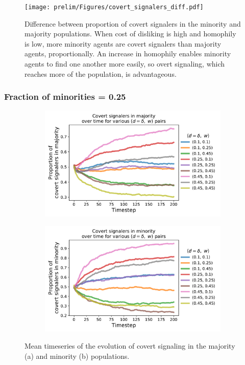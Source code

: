 \documentclass[11pt,letterpaper]{article}
\begin{document}
\begin{figure}[H]
  \centering
    \texttt{[image: prelim/Figures/covert\_signalers\_diff.pdf]}
  \caption{Difference between proportion of covert signalers in the minority 
    and majority populations. When cost of disliking is high and homophily is 
    low, more minority agents are covert signalers than majority agents,
    proportionally. An increase in homophily enables minority agents to 
    find one another more easily, so overt signaling, which reaches more of
    the population, is advantageous.
  }
  \label{fig:}
\end{figure}

\subsubsection{Fraction of minorities = 0.25}

\begin{figure}[H]
  \centering
  \begin{subfigure}{0.49\textwidth}
    \centering
    \includegraphics[width=\textwidth]{prelim/Figures/covert_series_majority_025.pdf}
    \caption{}
    \label{fig:}
  \end{subfigure}
  \begin{subfigure}{0.49\textwidth}
    \centering
    \includegraphics[width=\textwidth]{prelim/Figures/covert_series_minority_025.pdf}
    \caption{}
    \label{fig:}
  \end{subfigure}
  \caption{Mean timeseries of the evolution of covert signaling in the
    majority (a) and minority (b) populations.}
  \label{fig:regressions}
\end{figure}
\end{document}
